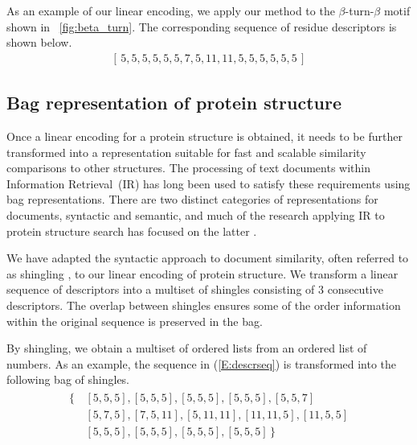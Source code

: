 \documentclass[letter,center,fleqn]{NAR}
\begin{document}
As an example of our linear encoding, we apply our method to the $\beta$-turn-$\beta$ motif shown in \figurename~\ref{fig:beta_turn}.
The corresponding sequence of residue descriptors is shown below.
\begin{gather}\label{E:descrseq} 
    [\, 5, 5, 5, 5, 5, 5, 7, 5, 11, 11, 5, 5, 5, 5, 5, 5 \,]
\end{gather}

\subsection{Bag representation of protein structure}

Once a linear encoding for a protein structure is obtained, it needs to be further transformed into a representation suitable for fast and scalable similarity comparisons to other structures.
The processing of text documents within Information Retrieval~(IR) has long been used to satisfy these requirements using bag representations.
There are two distinct categories of representations for documents, syntactic and semantic, and much of the research applying IR to protein structure search has focused on the latter \cite{Aungand2004,Zhang2010,Budowski2010}. 

We have adapted the syntactic approach to document similarity, often referred to as shingling \cite{Broder1997a}, to our linear encoding of protein structure. 
We transform a linear sequence of descriptors into a multiset of shingles consisting of 3 consecutive descriptors.
The overlap between shingles ensures some of the order information within the original sequence is preserved in the bag. 

By shingling, we obtain a multiset of ordered lists from an ordered list of numbers. 
As an example, the sequence in (\ref{E:descrseq}) is transformed into the following bag of shingles. 
\begin{align}\label{E:shinglebag}
    \begin{split}
        \{\,&[5, 5, 5], [5, 5, 5], [5, 5, 5], [5, 5, 5], [5, 5, 7] \\
            & [5, 7, 5], [7, 5, 11], [5, 11, 11], [11, 11, 5], [11, 5, 5] \\
            & [5, 5, 5], [5, 5, 5], [5, 5, 5], [5, 5, 5] \,\}
    \end{split}
\end{align}
\end{document}
